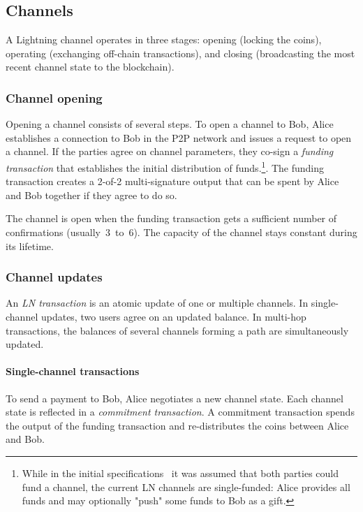 \subsection{Channels}

A Lightning channel operates in three stages: opening (locking the coins), operating (exchanging off-chain transactions), and closing (broadcasting the most recent channel state to the blockchain).


\subsubsection*{Channel opening}

Opening a channel consists of several steps.
To open a channel to Bob, Alice establishes a connection to Bob in the P2P network and issues a request to open a channel.
If the parties agree on channel parameters, they co-sign a \textit{funding transaction} that establishes the initial distribution of funds.\footnote{While in the initial specifications~\cite{Poon2016} it was assumed that both parties could fund a channel, the current LN channels are single-funded: Alice provides all funds and may optionally "push" some funds to Bob as a gift.}.
The funding transaction creates a 2-of-2 multi-signature output that can be spent by Alice and Bob together if they agree to do so.

The channel is open when the funding transaction gets a sufficient number of confirmations (usually~$3$~to~$6$).
The capacity of the channel stays constant during its lifetime.

\subsubsection*{Channel updates}

An \textit{LN transaction} is an atomic update of one or multiple channels.
In single-channel updates, two users agree on an updated balance.
In multi-hop transactions, the balances of several channels forming a path are simultaneously updated.

\paragraph{Single-channel transactions}

To send a payment to Bob, Alice negotiates a new channel state.
Each channel state is reflected in a \textit{commitment transaction}.
A commitment transaction spends the output of the funding transaction and re-distributes the coins between Alice and Bob.

